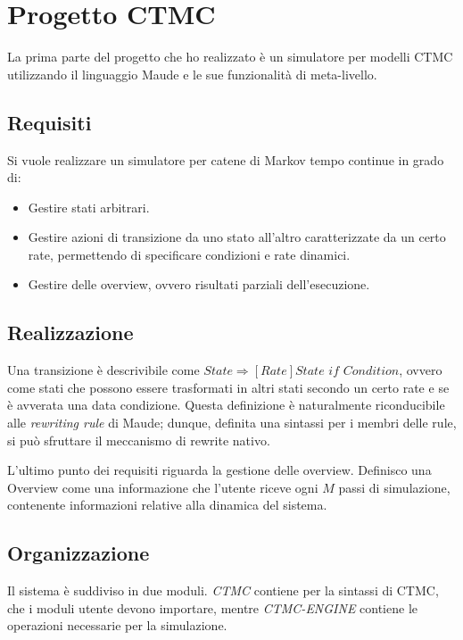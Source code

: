 \section{Progetto CTMC}

La prima parte del progetto che ho realizzato è un simulatore per modelli
CTMC utilizzando il linguaggio Maude e le sue funzionalità di meta-livello.

\subsection{Requisiti}
\label{sec:requisiti}

Si vuole realizzare un simulatore per catene di Markov tempo continue in grado
di:
\begin{itemize}
  \item Gestire stati arbitrari.
  \item Gestire azioni di transizione da uno stato all'altro caratterizzate da
  un certo rate, permettendo di specificare condizioni e rate dinamici.
  \item Gestire delle overview, ovvero risultati parziali dell'esecuzione.
\end{itemize}

\subsection{Realizzazione}

Una transizione è descrivibile come $State \Longrightarrow [Rate] State$ $if$
 $Condition$, ovvero come stati che possono essere trasformati in altri stati
secondo un certo rate e se è avverata una data condizione. Questa definizione è
naturalmente riconducibile alle \emph{rewriting rule} di Maude; dunque, definita
una sintassi per i membri delle rule, si può sfruttare il meccanismo di rewrite
nativo.

L'ultimo punto dei requisiti riguarda la gestione delle overview. Definisco una
Overview come una informazione che l'utente riceve ogni $M$ passi di
simulazione, contenente informazioni relative alla dinamica del sistema.

\subsection{Organizzazione}

Il sistema è suddiviso in due moduli. \emph{CTMC} contiene per la sintassi
di CTMC, che i moduli utente devono importare, mentre \emph{CTMC-ENGINE}
contiene le operazioni necessarie per la simulazione.

